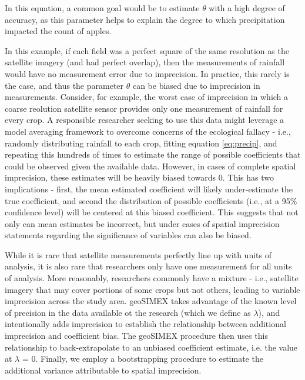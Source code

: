 In this equation, a common goal would be to estimate $\theta$ with a high degree of accuracy, as this parameter helps to explain the degree to which precipitation impacted the count of apples.
\par
In this example, if each field was a perfect square of the same resolution as the satellite imagery (and had perfect overlap), then the measurements of rainfall would have no measurement error due to imprecision.
In practice, this rarely is the case, and thus the parameter $\theta$ can be biased due to imprecision in measurements.
Consider, for example, the worst case of imprecision in which a coarse reolution satellite sensor provides only one measurement of rainfall for every crop.
A responsible researcher seeking to use this data might leverage a model averaging framework to overcome concerns of the ecological fallacy - i.e., randomly distributing rainfall to each crop, fitting equation \ref{eq:precip}, and repeating this hundreds of times to estimate the range of possible coefficients that could be observed given the available data.
However, in cases of complete spatial imprecision, these estimates will be heavily biased towards 0.
This has two implications - first, the mean estimated coefficient will likely under-estimate the true coefficient, and second the distribution of possible coefficients (i.e., at a 95\% confidence level) will be centered at this biased coefficient.  
This suggests that not only can mean estimates be incorrect, but under cases of spatial imprecision statements regarding the significance of variables can also be biased.
\par
While it is rare that satellite measurements perfectly line up with units of analysis, it is also rare that researchers only have one measurement for all units of analysis.
More reasonably, researchers commonly have a mixture - i.e., satellite imagery that may cover portions of some crops but not others, leading to variable imprecision across the study area.
geoSIMEX takes advantage of the known level of precision in the data available ot the research (which we define as $\lambda$), and intentionally adds imprecision to establish the relationship between additional imprecision and coefficient bias.
The geoSIMEX procedure then uses this relationship to back-extrapolate to an unbiased coefficient estimate, i.e. the value at $\lambda$ = 0.
Finally, we employ a bootstrapping procedure to estimate the additional variance attributable to spatial imprecision.





